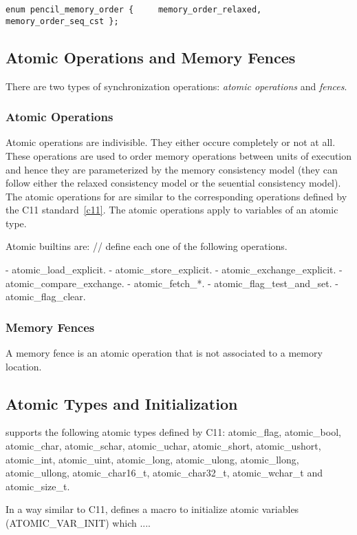 \lstinline!enum pencil_memory_order {
    memory_order_relaxed,
    memory_order_seq_cst
};!

\subsection{Atomic Operations and Memory Fences}

There are two types of synchronization operations: \emph{atomic operations} and
\emph{fences}.

\subsubsection{Atomic Operations}
Atomic operations are indivisible. They either occure completely or not at all.
These operations are used to order memory operations between units of execution
and hence they are parameterized by the \pencil memory consistency model
(they can follow either the relaxed consistency model or the seuential
consistency model).
The atomic operations for \pencil are similar to the corresponding operations
defined by the C11 standard~\ref{c11}.
The \pencil atomic operations apply to variables of an atomic type.

Atomic builtins are:
// define each one of the following operations.

- atomic_load_explicit.
- atomic_store_explicit.
- atomic_exchange_explicit.
- atomic_compare_exchange.
- atomic_fetch_*.
- atomic_flag_test_and_set.
- atomic_flag_clear.


\subsubsection{Memory Fences}
A memory fence is an atomic operation that is not associated to a memory
location.


\subsection{Atomic Types and Initialization}
\pencil supports the following atomic types defined by C11: atomic_flag,
atomic_bool, atomic_char, atomic_schar, atomic_uchar, atomic_short,
atomic_ushort, atomic_int, atomic_uint, atomic_long, atomic_ulong, atomic_llong,
atomic_ullong, atomic_char16_t, atomic_char32_t, atomic_wchar_t and
atomic_size_t.

In a way similar to C11, \pencil defines a macro to initialize atomic variables
(ATOMIC_VAR_INIT) which ....


